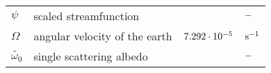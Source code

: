 \newpage
\begin{tabular*}{\textwidth}{l@{\extracolsep\fill}lll}

$\psi$         & scaled streamfunction                      &         & $\rm -$ \\
$\Omega$  & angular velocity of the earth              & $\rm 7.292\cdot 10^{-5}$ & $\rm
s^{-1}$ \\
$\tilde{\omega_0}$ & single scattering albedo     &    &$\rm- $\\

\end{tabular*}






